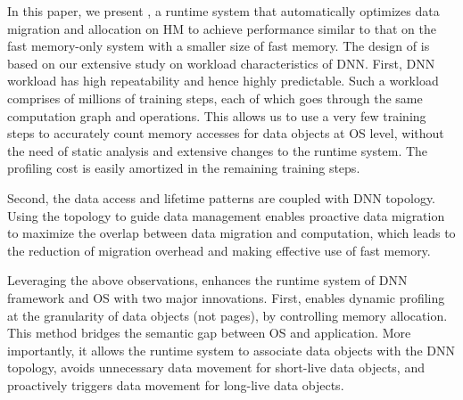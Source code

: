 In this paper, we present \textit{\name}, a runtime system that automatically optimizes data migration and allocation on HM to achieve performance similar to that on the fast memory-only system with a smaller size of fast memory. 
\textcolor{check}{The design of \name is based on our extensive study on workload characteristics of DNN. First, DNN workload has high repeatability and hence highly predictable. Such a workload comprises of millions of training steps, each of which goes through the 
\textcolor{check}{same computation graph and operations.}
This allows us to use a very few training steps to accurately count memory accesses for data objects at OS level, without the need of static analysis and extensive changes to the runtime system. The profiling cost is easily amortized in the remaining training steps.}

\textcolor{check}{Second, the data access and lifetime patterns are coupled with DNN topology. Using the topology to guide data management enables proactive data migration to maximize the overlap between data migration and computation, which leads to the reduction of migration overhead and making effective use of fast memory. }

Leveraging the above observations, \name enhances the runtime system of DNN framework and OS with two major innovations. First, \name enables dynamic profiling at the granularity of data objects (not pages), by controlling memory allocation. This method bridges the semantic gap between OS and application. More importantly, it allows the runtime system to associate data objects with the DNN topology, 
\textcolor{check}{avoids unnecessary data movement for short-live data objects, and proactively triggers data movement for long-live data objects.} %

